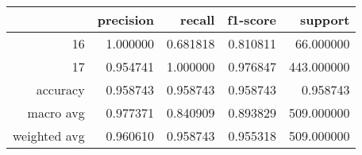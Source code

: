 \begin{tabular}{rrrrr}
\toprule
 & precision & recall & f1-score & support \\
\midrule
16 & 1.000000 & 0.681818 & 0.810811 & 66.000000 \\
17 & 0.954741 & 1.000000 & 0.976847 & 443.000000 \\
accuracy & 0.958743 & 0.958743 & 0.958743 & 0.958743 \\
macro avg & 0.977371 & 0.840909 & 0.893829 & 509.000000 \\
weighted avg & 0.960610 & 0.958743 & 0.955318 & 509.000000 \\
\bottomrule
\end{tabular}
